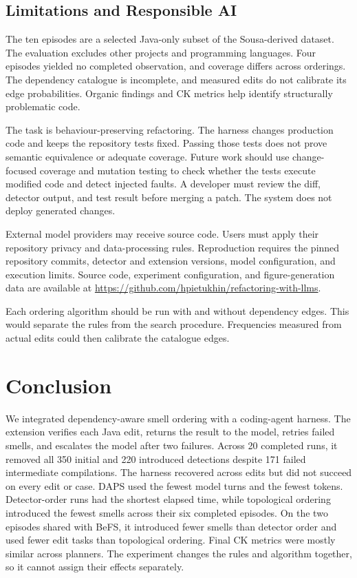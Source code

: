 \documentclass[conference]{IEEEtran}
\begin{document}
\subsection{Limitations and Responsible AI}

The ten episodes are a selected Java-only subset of the Sousa-derived dataset.
The evaluation excludes other projects and programming languages. Four
episodes yielded no completed observation, and coverage differs across
orderings. The dependency catalogue is incomplete, and measured edits do not
calibrate its edge probabilities. Organic findings and CK metrics help identify
structurally problematic code.

The task is behaviour-preserving refactoring. The harness changes production
code and keeps the repository tests fixed. Passing those tests does not prove
semantic equivalence or adequate coverage. Future work should use
change-focused coverage and mutation testing to check whether the tests execute
modified code and detect injected faults. A developer must review the diff,
detector output, and test result before merging a patch. The system does not
deploy generated changes.

External model providers may receive source code. Users must apply their
repository privacy and data-processing rules. Reproduction requires the pinned
repository commits, detector and extension versions, model configuration, and
execution limits. Source code, experiment configuration, and figure-generation
data are available at
\url{https://github.com/hpietukhin/refactoring-with-llms}.

Each ordering algorithm should be run with and without dependency edges. This
would separate the rules from the search procedure. Frequencies measured from
actual edits could then calibrate the catalogue edges.

\section{Conclusion}

We integrated dependency-aware smell ordering with a coding-agent harness. The
extension verifies each Java edit, returns the result to the model, retries
failed smells, and escalates the model after two failures. Across 20 completed
runs, it removed all 350 initial and 220 introduced detections despite 171 failed
intermediate compilations. The harness recovered across edits but did not
succeed on every edit or case. DAPS used the fewest model turns and the
fewest tokens. Detector-order runs had the shortest elapsed time, while
topological ordering introduced the fewest smells across their six completed
episodes. On the two episodes shared with BeFS, it introduced fewer smells than
detector order and used fewer edit tasks than topological ordering. Final
CK metrics were mostly similar across planners. The experiment changes the
rules and algorithm together, so it cannot assign their effects separately.
\end{document}
